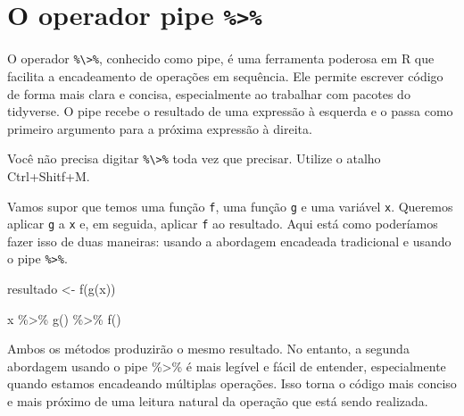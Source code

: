 \documentclass[
  portuguese,
  letterpaper,
  DIV=11,
  numbers=noendperiod]{scrreprt}
\newenvironment{Shaded}{\begin{snugshade}}{\end{snugshade}}
\newcommand{\FunctionTok}[1]{\textcolor[rgb]{0.28,0.35,0.67}{#1}}
\newcommand{\NormalTok}[1]{\textcolor[rgb]{0.00,0.23,0.31}{#1}}
\newcommand{\OtherTok}[1]{\textcolor[rgb]{0.00,0.23,0.31}{#1}}
\newcommand{\SpecialCharTok}[1]{\textcolor[rgb]{0.37,0.37,0.37}{#1}}
\theoremstyle{definition}
\theoremstyle{remark}
\begin{document}
\section{\texorpdfstring{O operador pipe
\texttt{\%\textgreater{}\%}}{O operador pipe \%\textgreater\%}}\label{o-operador-pipe}

O operador \texttt{\%\textbackslash{}\textgreater{}\%}, conhecido como
pipe, é uma ferramenta poderosa em R que facilita a encadeamento de
operações em sequência. Ele permite escrever código de forma mais clara
e concisa, especialmente ao trabalhar com pacotes do tidyverse. O pipe
recebe o resultado de uma expressão à esquerda e o passa como primeiro
argumento para a próxima expressão à direita.

\begin{tcolorbox}[enhanced jigsaw, leftrule=.75mm, opacitybacktitle=0.6, colback=white, coltitle=black, colframe=quarto-callout-tip-color-frame, titlerule=0mm, left=2mm, opacityback=0, breakable, bottomtitle=1mm, toprule=.15mm, title=\textcolor{quarto-callout-tip-color}{\faLightbulb}\hspace{0.5em}{Dica}, colbacktitle=quarto-callout-tip-color!10!white, arc=.35mm, rightrule=.15mm, bottomrule=.15mm, toptitle=1mm]

Você não precisa digitar \texttt{\%\textbackslash{}\textgreater{}\%}
toda vez que precisar. Utilize o atalho Ctrl+Shitf+M.

\end{tcolorbox}

Vamos supor que temos uma função \texttt{f}, uma função \texttt{g} e uma
variável \texttt{x}. Queremos aplicar \texttt{g} a \texttt{x} e, em
seguida, aplicar \texttt{f} ao resultado. Aqui está como poderíamos
fazer isso de duas maneiras: usando a abordagem encadeada tradicional e
usando o pipe \texttt{\%\textgreater{}\%}.

\begin{Shaded}
\begin{Highlighting}[]
\NormalTok{resultado }\OtherTok{\textless{}{-}} \FunctionTok{f}\NormalTok{(}\FunctionTok{g}\NormalTok{(x))}

\NormalTok{x }\SpecialCharTok{\%\textgreater{}\%} 
  \FunctionTok{g}\NormalTok{() }\SpecialCharTok{\%\textgreater{}\%}
  \FunctionTok{f}\NormalTok{()}
\end{Highlighting}
\end{Shaded}

Ambos os métodos produzirão o mesmo resultado. No entanto, a segunda
abordagem usando o pipe \%\textgreater\% é mais legível e fácil de
entender, especialmente quando estamos encadeando múltiplas operações.
Isso torna o código mais conciso e mais próximo de uma leitura natural
da operação que está sendo realizada.
\end{document}
